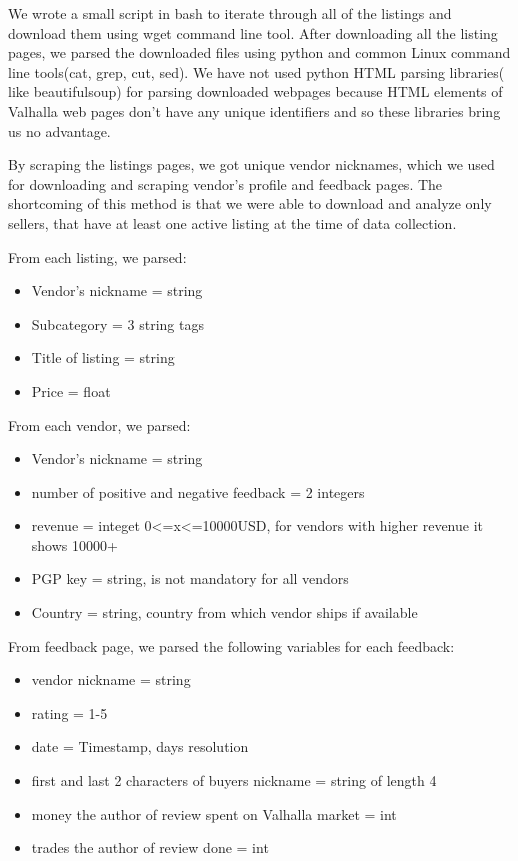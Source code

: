 \documentclass[
  digital, %
  table,   %
  lof,     %
  lot,     %
  oneside
]{fithesis3}
\begin{document}
We wrote a small script in bash to iterate through all of the listings
and download them using wget command line tool.
After downloading all the listing pages,
we parsed the downloaded files using python and common Linux command line tools(cat, grep, cut, sed).
We have not used python HTML parsing libraries( like beautifulsoup) for parsing downloaded
webpages because HTML elements of Valhalla web pages don't have any unique identifiers
and so these libraries bring us no advantage.
 
By scraping the listings pages, we got unique vendor nicknames,
which we used for downloading and scraping vendor's profile and feedback pages.
The shortcoming of this method is that we were able to download and analyze only sellers, 
that have at least one active listing at the time of data collection. 

From each listing, we parsed:

\begin{itemize}
 \item Vendor's nickname = string
 \item Subcategory = 3 string tags
 \item Title of listing = string
 \item Price = float
\end{itemize}

From each vendor, we parsed:
\begin{itemize}
\item Vendor's nickname = string
\item number of positive and negative feedback = 2 integers
\item revenue = integet 0<=x<=10000USD, for vendors with higher revenue it shows 10000+
\item PGP key = string, is not mandatory for all vendors
\item Country = string, country from which vendor ships if available
\end{itemize}

From feedback page, we parsed the following variables for each feedback:
\begin{itemize}
\item vendor nickname = string
\item rating = 1-5
\item date = Timestamp, days resolution
\item first and last 2 characters of buyers nickname = string of length 4
\item money the author of review spent on Valhalla market = int
\item trades the author of review done = int
\end{itemize}
\end{document}

